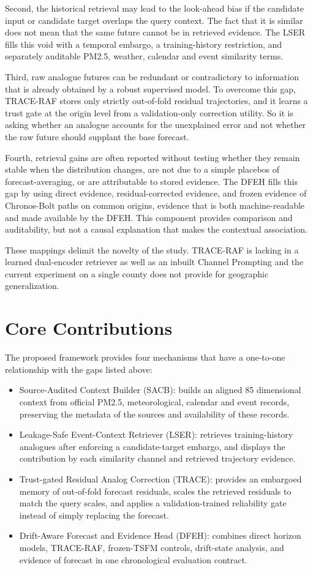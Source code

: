 \documentclass{ieeeaccess}
\begin{document}
Second, the historical retrieval may lead to the look-ahead bias if the candidate input or candidate target overlaps the query context. The fact that it is similar does not mean that the same future cannot be in retrieved evidence. The LSER fills this void with a temporal embargo, a training-history restriction, and separately auditable PM2.5, weather, calendar and event similarity terms.

Third, raw analogue futures can be redundant or contradictory to information that is already obtained by a robust supervised model. To overcome this gap, TRACE-RAF stores only strictly out-of-fold residual trajectories, and it learns a trust gate at the origin level from a validation-only correction utility. So it is asking whether an analogue accounts for the unexplained error and not whether the raw future should supplant the base forecast.

Fourth, retrieval gains are often reported without testing whether they remain stable when the distribution changes, are not due to a simple placebos of forecast-averaging, or are attributable to stored evidence. The DFEH fills this gap by using direct evidence, residual-corrected evidence, and frozen evidence of Chronos-Bolt paths on common origins, evidence that is both machine-readable and made available by the DFEH. This component provides comparison and auditability, but not a causal explanation that makes the contextual association.

These mappings delimit the novelty of the study. TRACE-RAF is lacking in a learned dual-encoder retriever as well as an inbuilt Channel Prompting and the current experiment on a single county does not provide for geographic generalization.

\section{Core Contributions}

The proposed framework provides four mechanisms that have a one-to-one relationship with the gaps listed above:
\begin{itemize}
    \item Source-Audited Context Builder (SACB): builds an aligned 85 dimensional context from official PM2.5, meteorological, calendar and event records, preserving the metadata of the sources and availability of these records.
    \item Leakage-Safe Event-Context Retriever (LSER): retrieves training-history analogues after enforcing a candidate-target embargo, and displays the contribution by each similarity channel and retrieved trajectory evidence.
    \item Trust-gated Residual Analog Correction (TRACE): provides an embargoed memory of out-of-fold forecast residuals, scales the retrieved residuals to match the query scales, and applies a validation-trained reliability gate instead of simply replacing the forecast.
    \item Drift-Aware Forecast and Evidence Head (DFEH): combines direct horizon models, TRACE-RAF, frozen-TSFM controls, drift-state analysis, and evidence of forecast in one chronological evaluation contract.
\end{itemize}
\end{document}
